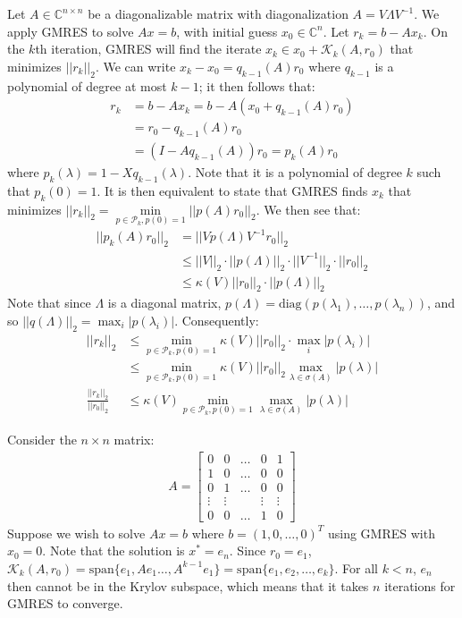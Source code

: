 \documentclass{article}
\begin{document}
\clearpage
\problem{}
Let $A \in \mathbb{C}^{n \times n}$ be a diagonalizable matrix with diagonalization $A = V\Lambda V^{-1}$. We apply GMRES to solve $Ax = b$, with initial guess $x_0 \in \mathbb{C}^n$. Let $r_k = b - Ax_k$. On the $k$th iteration, GMRES will find the iterate $x_k \in x_0 + \mathcal{K}_k(A, r_0)$ that minimizes $||r_k||_2$. We can write $x_k - x_0 = q_{k-1}(A)r_0$ where $q_{k-1}$ is a polynomial of degree at most $k - 1$; it then follows that:
\begin{align*}
    r_k & = b - Ax_k = b - A(x_0 + q_{k-1}(A)r_0) \\
    & = r_0 - q_{k-1}(A)r_0 \\
    & = (I - Aq_{k-1}(A))r_0 = p_k(A)r_0
\end{align*}
where $p_k(\lambda) = 1 - Xq_{k-1}(\lambda)$. Note that it is a polynomial of degree $k$ such that $p_k(0) = 1$. It is then equivalent to state that GMRES finds $x_k$ that minimizes $||r_k||_2 = \underset{p \in \mathcal{P}_k, p(0) = 1}{\min} ||p(A)r_0||_2$. We then see that:
\begin{align*}
    ||p_k(A)r_0||_2 & = ||Vp(\Lambda)V^{-1}r_0||_2 \\
    & \leq ||V||_2 \cdot ||p(\Lambda)||_2 \cdot ||V^{-1}||_2 \cdot ||r_0||_2 \\
    & \leq \kappa(V)||r_0||_2 \cdot ||p(\Lambda)||_2
\end{align*}
Note that since $\Lambda$ is a diagonal matrix, $p(\Lambda) = \mathrm{diag}(p(\lambda_1), \ldots, p(\lambda_n))$, and so $||q(\Lambda)||_2 = \max_i |p(\lambda_i)|$. Consequently:
\begin{align*}
    ||r_k||_2 & \leq \underset{p \in \mathcal{P}_k, p(0) = 1}{\min} \kappa(V)||r_0||_2 \cdot \max_i |p(\lambda_i)|  \\
    & \leq \underset{p \in \mathcal{P}_k, p(0) = 1}{\min} \kappa(V)||r_0||_2 \max_{\lambda \in \sigma(A)} |p(\lambda)| \\
    \frac{||r_k||_2}{||r_0||_2} & \leq \kappa(V)\underset{p \in \mathcal{P}_k, p(0) = 1}{\min} \max_{\lambda \in \sigma(A)} |p(\lambda)|
\end{align*}

Consider the $n \times n$ matrix:
\begin{align*}
    A = \begin{bmatrix}
        0 & 0 & \ldots & 0 & 1 \\
        1 & 0 & \ldots & 0 & 0 \\
        0 & 1 & \ldots & 0 & 0 \\
        \vdots & \vdots & & \vdots & \vdots \\
        0 & 0 & \ldots & 1 & 0
    \end{bmatrix}
\end{align*}
Suppose we wish to solve $Ax = b$ where $b = (1, 0, \ldots, 0)^T$ using GMRES with $x_0 = 0$. Note that the solution is $x^* = e_n$. Since $r_0 = e_1$, $\mathcal{K}_k(A, r_0) = \mathrm{span}\{e_1, Ae_1 \ldots, A^{k-1}e_1\} = \mathrm{span}\{e_1, e_2, \ldots, e_k\}$. For all $k < n$, $e_n$ then cannot be in the Krylov subspace, which means that it takes $n$ iterations for GMRES to converge.
\end{document}
